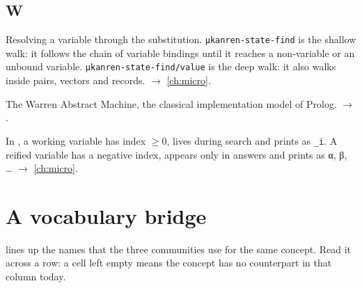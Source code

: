 \subsection*{W}
\begin{glossarylist}
\item[Walk] Resolving a variable through the substitution. \texttt{μkanren-state-find} is the shallow walk: it
  follows the chain of variable bindings until it reaches a non-variable or an unbound variable.
  \texttt{μkanren-state-find/value} is the deep walk: it also walks inside pairs, vectors and records. $\rightarrow$ \cref{ch:micro}.
\item[WAM] The Warren Abstract Machine, the classical implementation model of Prolog. $\rightarrow$ .
\item[Working variable, reified variable] In \micro{}, a working variable has index $\ge 0$, lives during search
  and prints as \texttt{\_i}. A reified variable has a negative index, appears only in answers and prints as α, β,
  \dots{} $\rightarrow$ \cref{ch:micro}.
\end{glossarylist}

\endgroup

\section{A vocabulary bridge}\label{sec:glossary-bridge}

 lines up the names that the three communities use for the same concept. Read it
across a row: a cell left empty means the concept has no counterpart in that column today.

